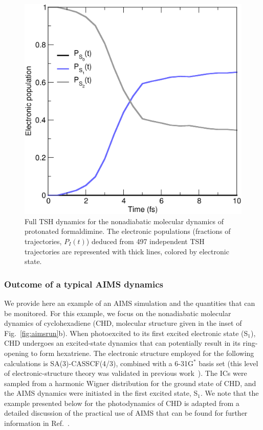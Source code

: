 \documentclass[9pt,bestpractices]{livecoms}
\begin{document}
\begin{figure}[h!]
    \centering
    \includegraphics[width=1.0\linewidth]{./figures/tsh_fullswarm.png}
    \caption{Full TSH dynamics for the nonadiabatic molecular dynamics of protonated formaldimine. The electronic populations (fractions of trajectories, $P_I(t)$) deduced from 497 independent TSH trajectories are represented with thick lines, colored by electronic state.}
    \label{fig:tshrun2}
\end{figure}


\subsubsection{Outcome of a typical AIMS dynamics}
\label{sec:aimsoutcome}

We provide here an example of an AIMS simulation and the quantities that can be monitored. For this example, we focus on the nonadiabatic molecular dynamics of cyclohexadiene (CHD, molecular structure given in the inset of Fig.~\ref{fig:aimsrun}b). When photoexcited to its first excited electronic state (S$_1$), CHD undergoes an excited-state dynamics that can potentially result in its ring-opening to form hexatriene. The electronic structure employed for the following calculations is SA(3)-CASSCF(4/3), combined with a 6-31G$^\ast$ basis set (this level of electronic-structure theory was validated in previous work~\cite{kim2011control,kim2015ab,snyder2016gpu}). The ICs were sampled from a harmonic Wigner distribution for the ground state of CHD, and the AIMS dynamics were initiated in the first excited state, S$_1$. We note that the example presented below for the photodynamics of CHD is adapted from a detailed discussion of the practical use of AIMS that can be found for further information in Ref.~.
\end{document}
